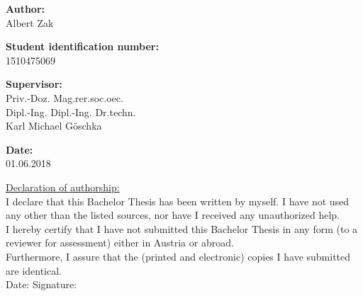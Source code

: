 \begin{center}
  \vspace{2cm}

  \hspace*{-1.0cm} \textbf{Author:} \\
  \vspace{0.2cm}
  \hspace*{-1.0cm} Albert Zak \\
  \vspace{0.7cm}

  \hspace*{-1.0cm} \textbf{Student identification number:}  \\
  \vspace{0.2cm}
  \hspace*{-1.0cm} 1510475069 \\
  \vspace{0.7cm}

  \hspace*{-1.0cm} \textbf{Supervisor:} \\
  \vspace{0.2cm}
  \hspace*{-1.0cm} Priv.-Doz. Mag.rer.soc.oec.\\
  \hspace*{-1.0cm} Dipl.-Ing. Dipl.-Ing. Dr.techn.\\
  \hspace*{-1.0cm} Karl Michael Göschka \\
  \vspace{0.7cm}

  \hspace*{-1.0cm} \textbf{Date:} \\
  \vspace{0.2cm}
  \hspace*{-1.0cm} 01.06.2018 \\

\end{center}

\newpage

\vspace*{16cm}
\begin{flushleft}
  \underline{Declaration of authorship:}\\
  \vspace{0.5cm}
  I declare that this Bachelor Thesis has been written by myself. I have not used any other than the listed sources, nor have I received any unauthorized help.\\
  \vspace{0.5cm}
  I hereby certify that I have not submitted this Bachelor Thesis in any form (to a reviewer for assessment) either in Austria or abroad.\\
  \vspace{0.5cm}
  Furthermore, I assure that the (printed and electronic) copies I have submitted are identical.\\
  \vspace{1cm}
  Date: \hspace{5.3cm} Signature:
\end{flushleft}
